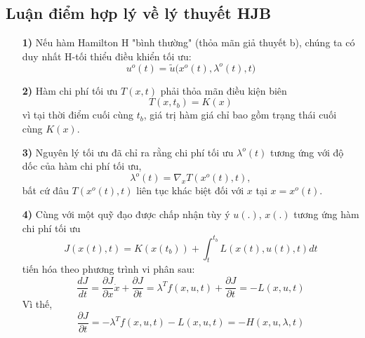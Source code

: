 \documentclass[11pt]{beamer}
\begin{document}
\subsection{Luận điểm hợp lý về lý thuyết HJB}
\begin{frame}
	\begin{enumerate}
		\item [\textbf{1)}] Nếu hàm Hamilton H "bình thường"   (thỏa mãn giả thuyết b), chúng ta có duy nhất
		H-tối thiểu điều khiển tối ưu: 
		\begin{equation}
			u^o(t) = \tilde{u}\big(x^o(t), \lambda^o(t), t\big)
		\end{equation}
		\item [\textbf{2)}] Hàm chi phí tối ưu $T(x, t)$ phải thỏa mãn điều kiện biên $$T(x, t_b) = K(x)$$ vì tại thời điểm cuối cùng $t_b$, giá trị hàm giá chỉ bao gồm trạng thái cuối cùng $K(x)$.\item[\textbf{3)}] Nguyên lý tối ưu đã chỉ ra rằng chi phí tối ưu $\lambda^o(t)$ tương ứng với độ dốc của hàm chi phí tối ưu, \begin{equation}
			\lambda^o(t) = \nabla_xT(x^o(t),t),
		\end{equation} bất cứ đâu $T(x^o(t), t)$ liên tục khác biệt đối với $x$ tại $x = x^o(t)$.
	\end{enumerate}
\end{frame}

\begin{frame}
\begin{enumerate}
	\item [\textbf{4)}] Cùng với một quỹ đạo được chấp nhận tùy ý $u(.)$, $x(.)$ tương ứng
	hàm chi phí tối ưu \begin{equation}
	J(x(t), t) = K(x(t_b)) + \int_{t}^{t_b}L(x(t), u(t), t)dt
	\end{equation} tiến hóa theo phương trình vi phân sau: \begin{equation}
		\frac{dJ}{dt} = \frac{\partial J}{\partial x}\dot{x} + \frac{\partial J}{\partial t} = \lambda^Tf(x, u, t) + \frac{\partial J}{\partial t} = -L(x, u, t)
	\end{equation} Vì thế, \begin{equation}
		\frac{\partial J}{\partial t} = -\lambda^Tf(x, u, t) - L(x, u, t) = -H(x, u, \lambda, t)
	\end{equation}
\end{enumerate}
\end{frame}
\end{document}
